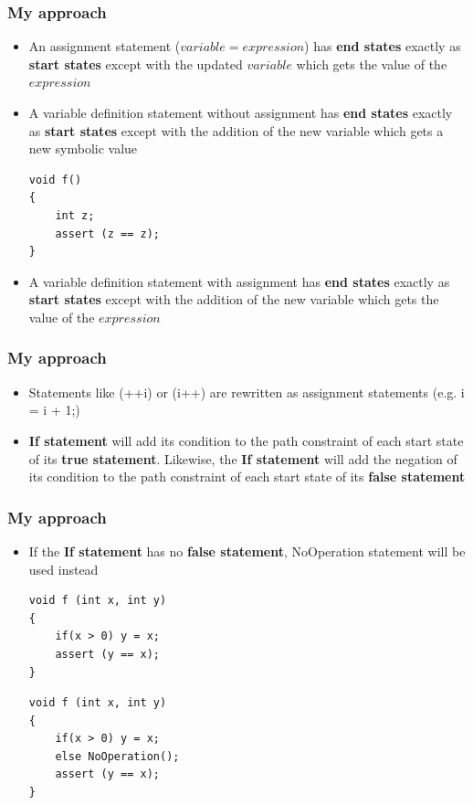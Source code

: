 \documentclass{beamer}
\begin{document}
\begin{frame}[fragile]
\frametitle{My approach}
\begin{itemize}
\item An assignment statement ($variable = expression$) has \textbf{end states} exactly as \textbf{start states} except with the updated $variable$ which gets the value of the $expression$

\item A variable definition statement without assignment has \textbf{end states} exactly as \textbf{start states} except with the addition of the new variable which gets a new symbolic value

\begin{lstlisting}  
void f()
{
	int z;
	assert (z == z);
}
\end{lstlisting}

\item  A variable definition statement with assignment has \textbf{end states} exactly as \textbf{start states} except with the addition of the new variable which gets the value of the $expression$

\end{itemize}
\end{frame}

\begin{frame}[fragile]
\frametitle{My approach}
\begin{itemize}
\item Statements like (++i) or (i++) are rewritten as assignment statements (e.g. i = i + 1;)
\item \textbf{If statement} will add its condition to the path constraint of each start state of its
\textbf{true statement}. Likewise, the \textbf{If statement} will add the negation of its condition to the
path constraint of each start state of its \textbf{false statement}


\end{itemize}
\end{frame}


\begin{frame}[fragile]
\frametitle{My approach}
\begin{itemize}

\item If the \textbf{If statement} has no \textbf{false statement}, NoOperation statement will be used instead

\begin{lstlisting}  
void f (int x, int y) 
{ 
	if(x > 0) y = x;  
	assert (y == x);
}
\end{lstlisting}

\begin{lstlisting}  
void f (int x, int y) 
{ 
	if(x > 0) y = x;  
	else NoOperation();
	assert (y == x);
}
\end{lstlisting}

\end{itemize}
\end{frame}
\end{document}
